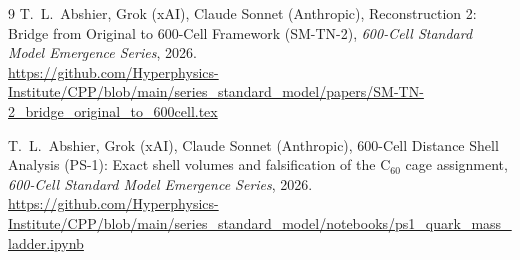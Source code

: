 \documentclass[11pt]{article}
\begin{document}
\begin{thebibliography}{9}
T.~L.~Abshier, Grok (xAI), Claude Sonnet (Anthropic),
Reconstruction 2: Bridge from Original to 600-Cell Framework (SM-TN-2),
\textit{600-Cell Standard Model Emergence Series}, 2026.\\
\url{https://github.com/Hyperphysics-Institute/CPP/blob/main/series_standard_model/papers/SM-TN-2_bridge_original_to_600cell.tex}

T.~L.~Abshier, Grok (xAI), Claude Sonnet (Anthropic),
600-Cell Distance Shell Analysis (PS-1): Exact shell volumes and
falsification of the C$_{60}$ cage assignment,
\textit{600-Cell Standard Model Emergence Series}, 2026.\\
\url{https://github.com/Hyperphysics-Institute/CPP/blob/main/series_standard_model/notebooks/ps1_quark_mass_ladder.ipynb}

\end{thebibliography}
\end{document}
